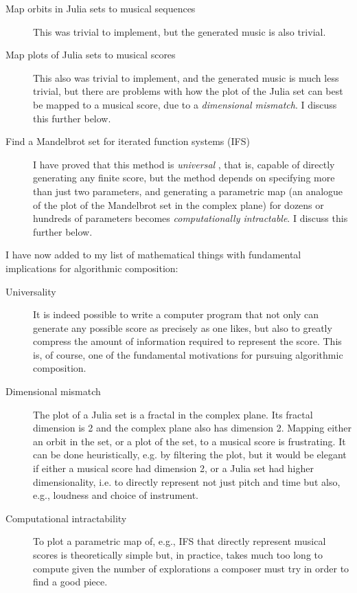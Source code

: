 \documentclass[11pt]{amsart}
\begin{document}
\begin{description}
\item[Map orbits in Julia sets to musical sequences] This was trivial to implement, but the generated music is also trivial.
\item[Map plots of Julia sets to musical scores] This also was trivial to implement, and the generated music is much less trivial, but there are problems with how the plot of the Julia set can best be mapped to a musical score, due to a \emph{dimensional mismatch}. I discuss this further below.
\item[Find a Mandelbrot set for iterated function systems (IFS)] I have proved that this method is \emph{universal} \cite{obsessed, gogins2023scoregraphs}, that is, capable of directly generating any finite score, but the method depends on specifying more than just two parameters, and generating a parametric map (an analogue of the plot of the Mandelbrot set in the complex plane) for dozens or hundreds of parameters becomes \emph{computationally intractable}. I discuss this further below.
\end{description}

I have now added to my list of mathematical things with fundamental implications for algorithmic composition:

\begin{description}
\item[Universality] It is indeed possible to write a computer program that not only can generate any possible score as precisely as one likes, but also to greatly compress the amount of information required to represent the score. This is, of course, one of the fundamental motivations for pursuing algorithmic composition.
\item[Dimensional mismatch] The plot of a Julia set is a fractal in the complex plane. Its fractal dimension is 2 and the complex plane also has dimension 2. Mapping either an orbit in the set, or a plot of the set, to a musical score is frustrating. It can be done heuristically, e.g. by filtering the plot, but it would be elegant if either a musical score had dimension 2, or a Julia set had higher dimensionality, i.e. to directly represent not just pitch and time but also, e.g., loudness and choice of instrument.
\item[Computational intractability] To plot a parametric map of, e.g., IFS that directly represent musical scores is theoretically simple but, in practice, takes much too long to compute given the number of explorations a composer must try in order to find a good piece.
\end{description}
\end{document}
